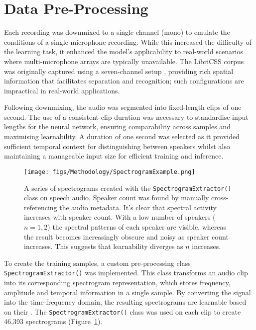 \section{Data Pre-Processing}
\label{sec:data_preproc}
Each recording was downmixed to a single channel (mono) to emulate the conditions of a single-microphone recording. While this increased the difficulty of the learning task, it enhanced the model's applicability to real-world scenarios where multi-microphone arrays are typically unavailable. The LibriCSS corpus was originally captured using a seven-channel setup \cite{libricss}, providing rich spatial information that facilitates separation and recognition; such configurations are impractical in real-world applications.

Following downmixing, the audio was segmented into fixed-length clips of one second. The use of a consistent clip duration was necessary to standardise input lengths for the neural network, ensuring comparability across samples and maximising learnability. A duration of one second was selected as it provided sufficient temporal context for distinguishing between speakers whilst also maintaining a manageable input size for efficient training and inference.

\begin{figure}[H]
  \centering
  \texttt{[image: figs/Methodology/SpectrogramExample.png]}
  \caption{A series of spectrograms created with the \lstinline!SpectrogramExtractor()! class on speech audio. Speaker count was found by manually cross-referencing the audio metadata. It's clear that spectral activity increases with speaker count. With a low number of speakers ($n = 1, 2$) the spectral patterns of each speaker are visible, whereas the result becomes increasingly obscure and noisy as speaker count increases. This suggests that learnability diverges as $n$ increases.}
  \label{fig:spec_samples}
\end{figure}

To create the training samples, a custom pre-processing class \lstinline!SpectrogramExtractor()! was implemented. This class transforms an audio clip into its corresponding spectrogram representation, which stores frequency, amplitude and temporal information in a single sample. By converting the signal into the time-frequency domain, the resulting spectrograms are learnable based on their . The \lstinline!SpectrogramExtractor()! class was used on each clip to create 46,393 spectrograms (Figure~\ref{fig:spec_samples}).

